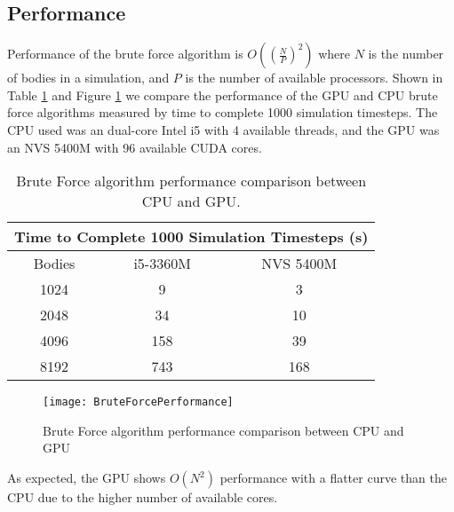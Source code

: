 \documentclass{thesis}
\begin{document}
\subsection{Performance}
Performance of the brute force algorithm is $O\left(\left(\frac{N}{P}\right)^2\right)$ where $N$ is the number of bodies in a simulation, and $P$ is the number of available processors. Shown in Table \ref{tab:BruteForcePerformance} and Figure \ref{fig:BruteForcePerformance} we compare the performance of the GPU and CPU brute force algorithms measured by time to complete 1000 simulation timesteps. The CPU used was an dual-core Intel i5 with 4 available threads, and the GPU was an NVS 5400M with 96 available CUDA cores.
\begin{table}
    \centering
    \caption{Brute Force algorithm performance comparison between CPU and GPU.}
    \label{tab:BruteForcePerformance}
    \begin{tabular}{|c|||c||c|}
        \hline
        \multicolumn{3}{|c|}{Time to Complete 1000 Simulation Timesteps (s)}\\
        \hline
        Bodies & i5-3360M & NVS 5400M \\
        \hline
        1024 & 9 & 3\\
        2048 & 34 & 10\\
        4096 & 158 & 39\\
        8192 & 743 & 168\\
        \hline
    \end{tabular}
\end{table}
\begin{figure}[t]
    \caption{Brute Force algorithm performance comparison between CPU and GPU}
    \label{fig:BruteForcePerformance}
    \centering
    \texttt{[image: BruteForcePerformance]}
\end{figure}
As expected, the GPU shows $O(N^2)$ performance with a flatter curve than the CPU due to the higher number of available cores.
\end{document}
